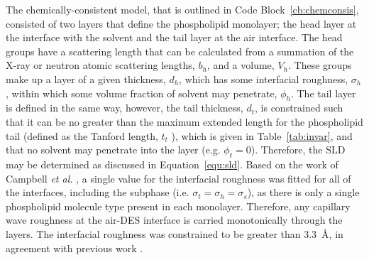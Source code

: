 The chemically-consistent model, that is outlined in Code Block~\ref{cb:chemconsis}, consisted of two layers that define the phospholipid monolayer; the head layer at the interface with the solvent and the tail layer at the air interface.
The head groups have a scattering length that can be calculated from a summation of the X-ray or neutron atomic scattering lengths, $b_h$, and a volume, $V_h$.
These groups make up a layer of a given thickness, $d_h$, which has some interfacial roughness, $\sigma_h$, within which some volume fraction of solvent may penetrate, $\phi_h$.
The tail layer is defined in the same way, however, the tail thickness, $d_t$, is constrained such that it can be no greater than the maximum extended length for the phospholipid tail (defined as the Tanford length, $t_t$ \cite{tanford_hydrophobic_1980}), which is given in Table~\ref{tab:invar}, and that no solvent may penetrate into the layer (e.g. $\phi_t=0$).
Therefore, the $\text{SLD}$ may be determined as discussed in Equation~\ref{equ:sld}.
Based on the work of Campbell \emph{et al.} \cite{campbell_structure_2018}, a single value for the interfacial roughness was fitted for all of the interfaces, including the subphase (i.e. $\sigma_t = \sigma_h = \sigma_s$), as there is only a single phospholipid molecule type present in each monolayer.
Therefore, any capillary wave roughness at the air-DES interface is carried monotonically through the layers. The interfacial roughness was constrained to be greater than \SI{3.3}{\angstrom}, in agreement with previous work \cite{sanchez-fernandez_micellization_2016}.
%
